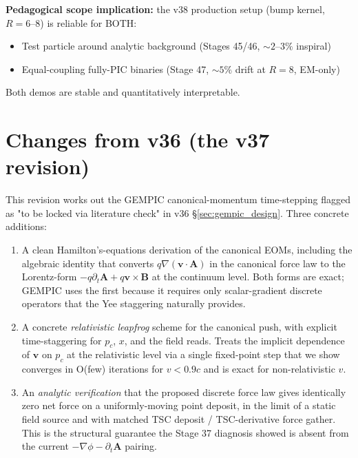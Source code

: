 \documentclass[11pt,a4paper]{article}
\newcommand{\vv}[1]{\mathbf{#1}}
\begin{document}
\textbf{Pedagogical scope implication:} the v38 production setup
(bump kernel, $R = 6$--$8$) is reliable for BOTH:
\begin{itemize}
  \item Test particle around analytic background (Stages 45/46, $\sim 2$--$3\%$ inspiral)
  \item Equal-coupling fully-PIC binaries (Stage 47, $\sim 5\%$ drift at $R=8$, EM-only)
\end{itemize}
Both demos are stable and quantitatively interpretable.

\newpage

\section*{Changes from v36 (the v37 revision)}

This revision works out the GEMPIC canonical-momentum time-stepping
flagged as "to be locked via literature check" in v36
§\ref{sec:gempic_design}.  Three concrete additions:

\begin{enumerate}
  \item A clean Hamilton's-equations derivation of the canonical
    EOMs, including the algebraic identity that converts
    $q\nabla(\vv{v}\cdot\vv{A})$ in the canonical force law to the
    Lorentz-form $-q\partial_t\vv{A} + q\vv{v}\times\vv{B}$ at the
    continuum level.  Both forms are exact; GEMPIC uses the first
    because it requires only scalar-gradient discrete operators
    that the Yee staggering naturally provides.
  \item A concrete \emph{relativistic leapfrog} scheme for the
    canonical push, with explicit time-staggering for $p_c$, $x$,
    and the field reads.  Treats the implicit dependence of
    $\vv{v}$ on $p_c$ at the relativistic level via a single
    fixed-point step that we show converges in O(few) iterations
    for $v < 0.9c$ and is exact for non-relativistic $v$.
  \item An \emph{analytic verification} that the proposed discrete
    force law gives identically zero net force on a uniformly-moving
    point deposit, in the limit of a static field source and with
    matched TSC deposit / TSC-derivative force gather.  This is the
    structural guarantee the Stage 37 diagnosis showed is absent
    from the current $-\nabla\phi - \partial_t\vv{A}$ pairing.
\end{enumerate}
\end{document}
